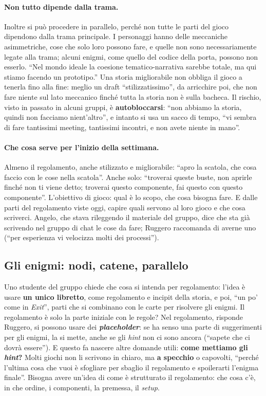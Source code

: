 \paragraph{Non tutto dipende dalla trama.} Inoltre si può procedere in parallelo, perché
non tutte le parti del gioco dipendono dalla trama principale. I personaggi hanno delle
meccaniche asimmetriche, cose che solo loro possono fare, e quelle non sono
necessariamente legate alla trama; alcuni enigmi, come quello del codice della porta,
possono non esserlo. ``Nel mondo ideale la coesione tematico-narrativa sarebbe totale, ma
qui stiamo facendo un prototipo.'' Una storia migliorabile non obbliga il gioco a tenerla
fino alla fine: meglio un draft ``stilizzatissimo'', da arricchire poi, che non fare niente
sul lato meccanico finché tutta la storia non è sulla bacheca. Il rischio, visto in
passato in alcuni gruppi, è \textbf{autobloccarsi}: ``non abbiamo la storia, quindi non
facciamo nient'altro'', e intanto si usa un sacco di tempo, ``vi sembra di fare
tantissimi meeting, tantissimi incontri, e non avete niente in mano''.

\paragraph{Che cosa serve per l'inizio della settimana.} Almeno il regolamento, anche
stilizzato e migliorabile: ``apro la scatola, che cosa faccio con le cose nella scatola''.
Anche solo: ``troverai queste buste, non aprirle finché non ti viene detto; troverai
questo componente, fai questo con questo componente''. L'obiettivo di gioco: qual è lo
scopo, che cosa bisogna fare. E dalle parti del regolamento viste oggi, capire quali
servono al loro gioco e che cosa scriverci. Angelo, che stava rileggendo il materiale del
gruppo, dice che sta già scrivendo nel gruppo di chat le cose da fare; Ruggero raccomanda
di averne uno (``per esperienza vi velocizza molti dei processi'').

\subsection{Gli enigmi: nodi, catene, parallelo}

Uno studente del gruppo chiede che cosa si intenda per regolamento: l'idea è usare
\textbf{un unico libretto}, come regolamento e incipit della storia, e poi, ``un po' come
in \emph{Exit}'', parti che si combinano con le carte per risolvere gli enigmi. Il
regolamento è solo la parte iniziale con le regole? Nel regolamento, risponde Ruggero, si
possono usare dei \textbf{\emph{placeholder}}: se ha senso una parte di suggerimenti per
gli enigmi, la si mette, anche se gli \emph{hint} non ci sono ancora (``sapete che ci
dovrà essere''). E questo fa nascere altre domande utili: \textbf{come mettiamo gli
\emph{hint}?} Molti giochi non li scrivono in chiaro, ma \textbf{a specchio} o capovolti,
``perché l'ultima cosa che vuoi è sfogliare per sbaglio il regolamento e spoilerarti
l'enigma finale''. Bisogna avere un'idea di come è strutturato il regolamento: che cosa
c'è, in che ordine, i componenti, la premessa, il \emph{setup}.

